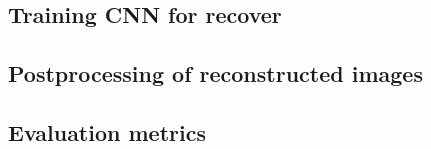 \subsection{Training CNN for recover}

\subsection{Postprocessing of reconstructed images}

\subsection{Evaluation metrics}

  
